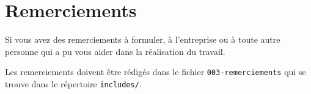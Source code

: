 

\newpage

\section*{Remerciements} %

Si vous avez des remerciements à formuler, à l’entreprise ou à toute autre personne qui a pu vous aider dans la réalisation du travail.

Les remerciements doivent être rédigés dans le fichier \texttt{003-remerciements} qui se trouve dans le répertoire \texttt{includes/}.



